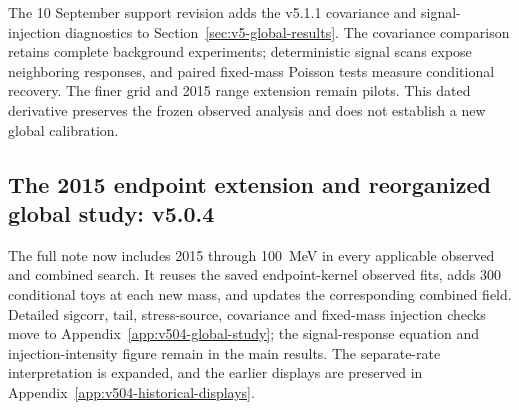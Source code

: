 The 10 September support revision adds the v5.1.1 covariance and
signal-injection diagnostics to Section~\ref{sec:v5-global-results}.
The covariance comparison retains complete background experiments;
deterministic signal scans expose neighboring responses, and paired
fixed-mass Poisson tests measure conditional recovery. The finer grid and
2015 range extension remain pilots. This dated derivative preserves the
frozen observed analysis and does not establish a new global calibration.

\subsection{The 2015 endpoint extension and reorganized global study: v5.0.4}
The full note now includes 2015 through 100~MeV in every applicable observed
and combined search. It reuses the saved endpoint-kernel observed fits,
adds 300 conditional toys at each new mass, and updates the corresponding
combined field. Detailed sigcorr, tail, stress-source, covariance and
fixed-mass injection checks move to Appendix~\ref{app:v504-global-study};
the signal-response equation and injection-intensity figure remain in the
main results. The separate-rate interpretation is expanded, and the earlier
displays are preserved in Appendix~\ref{app:v504-historical-displays}.
